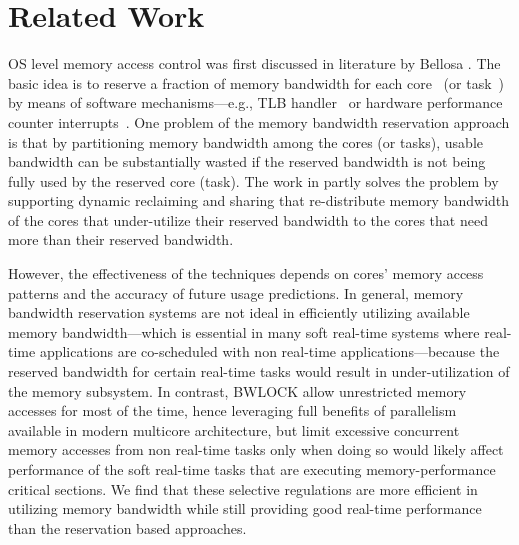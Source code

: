 \documentclass[times, 10pt,onecolumn]{article}
\begin{document}
\section{Related Work} \label{sec:related}

OS level memory access control was first discussed in literature by
Bellosa \cite{bellosa97processcruisecontrol}. The basic idea is to 
reserve a fraction of memory bandwidth for each
core~\cite{bellosa97processcruisecontrol,yun2012ecrts,yun2013rtas} (or
task~\cite{inam2014multi}) by means of software mechanisms---e.g., TLB 
handler~\cite{bellosa97processcruisecontrol} or hardware performance
counter interrupts~\cite{yun2013rtas,inam2014multi}. One problem of
the memory bandwidth reservation approach is that by partitioning
memory bandwidth among the cores (or tasks), usable bandwidth can be
substantially wasted if the reserved bandwidth is not being fully used
by the reserved core (task). The work in \cite{yun2013rtas} partly solves the
problem by supporting dynamic reclaiming and sharing that re-distribute
memory bandwidth of the cores that under-utilize their reserved
bandwidth to the cores that need more than their reserved bandwidth.

However, the effectiveness of the techniques depends on cores' memory access
patterns and the accuracy of future usage predictions. 
In general, memory bandwidth reservation systems are not ideal in
efficiently utilizing available memory bandwidth---which is essential in
many soft real-time systems where real-time applications are co-scheduled
with non real-time applications---because the reserved bandwidth for
certain real-time tasks would result in under-utilization of the
memory subsystem. In contrast, BWLOCK allow unrestricted memory 
accesses for most of the time, hence leveraging full benefits of
parallelism available in modern multicore architecture, but limit
excessive concurrent memory accesses from non real-time tasks only
when doing so would likely affect performance of the soft real-time
tasks that are executing memory-performance critical sections. 
We find that these selective regulations are more efficient in 
utilizing memory bandwidth while still providing good real-time
performance than the reservation based approaches.
\end{document}
